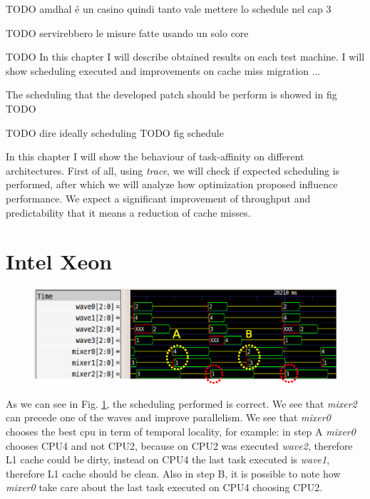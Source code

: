 TODO amdhal \'e un casino quindi tanto vale mettere lo schedule nel cap 3


TODO servirebbero le misure fatte usando un solo core

TODO
In this chapter I will describe obtained results on each test machine. I will show scheduling executed and improvements on cache miss migration  ...

The scheduling that the developed patch should be perform is showed in fig TODO

TODO dire ideally scheduling
TODO fig schedule

%	
%

In this chapter I will show the behaviour of task-affinity on different architectures. First of all, using \textit{trace}, we will check if expected 
scheduling is performed, after which we will analyze how optimization proposed influence performance. We expect a significant improvement of throughput and
predictability that it means a reduction of cache misses.

\section{Intel Xeon}

\begin{figure}[htbp]
\centering
\includegraphics[width=\widefigure]{images/results_xeon/final_xeon.eps}
\caption{}
\label{fig:trace_xeon}
\end{figure}

As we can see in Fig. \ref{fig:trace_xeon}, the scheduling performed is correct. We see that \textit{mixer2} can precede one of the waves and improve 
parallelism. We see that \textit{mixer0} chooses the best cpu in term of temporal locality, for example: in step A \textit{mixer0} chooses CPU4 and not 
CPU2, because on CPU2 was executed \textit{wave2}, therefore L1 cache could be dirty, instead on CPU4 the last task executed is \textit{wave1}, therefore 
L1 cache should be clean. Also in step B, it is possible to note how \textit{mixer0} take care about the last task executed on CPU4 choosing CPU2.

